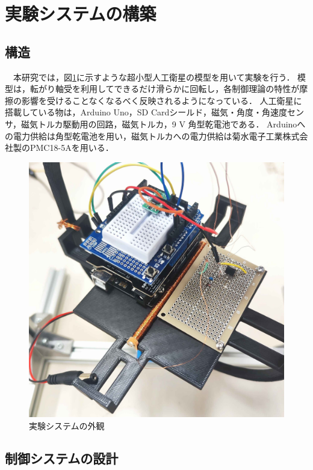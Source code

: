 \section{実験システムの構築}
\subsection{構造}
　本研究では，図\ref{fig:system}に示すような超小型人工衛星の模型を用いて実験を行う．
模型は，転がり軸受を利用してできるだけ滑らかに回転し，各制御理論の特性が摩擦の影響を受けることなくなるべく反映されるようになっている．
人工衛星に搭載している物は，Arduino Uno，SD Cardシールド，磁気・角度・角速度センサ，磁気トルカ駆動用の回路，磁気トルカ，9 V 角型乾電池である．
Arduinoへの電力供給は角型乾電池を用い，磁気トルカへの電力供給は菊水電子工業株式会社製のPMC18-5Aを用いる．

\begin{figure}[H]
	\centering
		\includegraphics[scale=0.1]{./figure/実験システム.jpg}
		\caption{実験システムの外観}
		\label{fig:system}
\end{figure}

\subsection{制御システムの設計}

